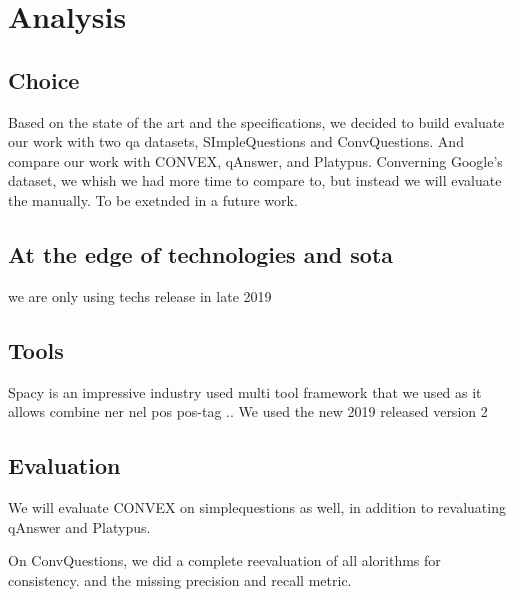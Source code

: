 \chapter{Analysis}
\label{chap:analysis}

\section{Choice}
Based on the state of the art and the specifications, we decided to build evaluate our work with two qa datasets, SImpleQuestions and ConvQuestions. And compare our work with CONVEX, qAnswer, and Platypus. Converning Google's dataset, we whish we had more time to compare to, but instead we will evaluate the manually. To be exetnded in a future work.

\section{At the edge of technologies and sota}
we are only using techs release in late 2019 

\section{Tools}
Spacy is an impressive industry used multi tool framework that we used as it allows combine \gls{ner} \gls{nel} \gls{pos} \gls{pos-tag} .. We used the new 2019 released version 2

\section{Evaluation}
We will evaluate CONVEX on simplequestions as well, in addition to revaluating qAnswer and Platypus.

On ConvQuestions, we did a complete reevaluation of all alorithms for consistency. and the missing precision and recall metric.